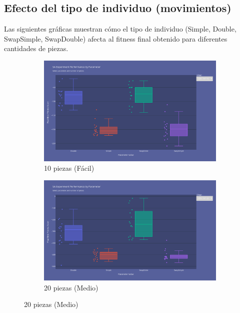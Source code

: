 \documentclass[11pt,spanish,listoffigures,listoftables]{tfgetsinf}
\begin{document}
\subsection{Efecto del tipo de individuo (movimientos)}

Las siguientes gráficas muestran cómo el tipo de individuo (Simple, Double, SwapSimple, SwapDouble) afecta al fitness final obtenido para diferentes cantidades de piezas.

\begin{figure}[H]
    \centering
    \begin{subfigure}[b]{0.48\textwidth}
        \centering
        \includegraphics[width=\textwidth]{images/SA_np-10_movements.png}
        \caption{10 piezas (Fácil)}
        \label{fig:sa_np10_movements}
    \end{subfigure}
    \hfill
    \begin{subfigure}[b]{0.48\textwidth}
        \centering
        \includegraphics[width=\textwidth]{images/SA_np-20_movements.png}
        \caption{20 piezas (Medio)}
        \label{fig:sa_np20_movements}
    \end{subfigure}
    

\end{figure}
\end{document}
